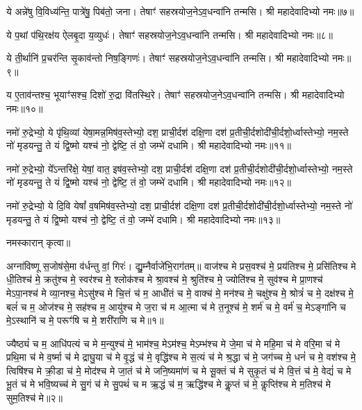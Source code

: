 ये अन्ने॑षु वि॒विध्य॑न्ति॒ पात्रे॑षु॒ पिब॑तो॒ जना\sn। तेषाꣳ॑ सहस्रयोज॒ने\-ऽव॒धन्वा॑नि तन्मसि। श्री महादेवादिभ्यो नमः॥७॥

ये प॒थां प॑थि॒रक्ष॑य ऐलबृ॒दा य॒व्युधः॑। तेषाꣳ॑ सहस्रयोज॒ने\-ऽव॒धन्वा॑नि तन्मसि। श्री महादेवादिभ्यो नमः॥८॥

ये ती॒र्थानि॑ प्र॒चर॑न्ति सृ॒काव॑न्तो निष॒ङ्गिणः॑। तेषाꣳ॑ सहस्रयोज॒ने\-ऽव॒धन्वा॑नि तन्मसि। श्री महादेवादिभ्यो नमः॥९॥

य ए॒ताव॑न्तश्च॒ भूयाꣳ॑सश्च॒ दिशो॑ रु॒द्रा वि॑तस्थि॒रे। तेषाꣳ॑ सहस्रयोज॒ने\-ऽव॒धन्वा॑नि तन्मसि। श्री महादेवादिभ्यो नमः॥१०॥

नमो॑ रु॒द्रेभ्यो॒ ये पृ॑थि॒व्यां येषा॒मन्न॒मिष॑व॒स्तेभ्यो॒ दश॒ प्राची॒र्दश॑ दक्षि॒णा दश॑ प्र॒तीची॒र्दशो\-दी॑ची॒र्दशो॒र्ध्वास्तेभ्यो॒ नम॒स्ते नो॑ मृडयन्तु॒ ते यं द्वि॒ष्मो यश्च॑ नो॒ द्वेष्टि॒ तं वो॒ जम्भे॑ दधामि। श्री महादेवादिभ्यो नमः॥११॥ 

नमो॑ रु॒द्रेभ्यो॒ ये᳚ऽन्तरि॑क्षे॒ येषां॒ वात॒ इष॑व॒स्तेभ्यो॒ दश॒ प्राची॒र्दश॑ दक्षि॒णा दश॑ प्र॒तीची॒र्दशो\-दी॑ची॒र्दशो॒र्ध्वास्तेभ्यो॒ नम॒स्ते नो॑ मृडयन्तु॒ ते यं द्वि॒ष्मो यश्च॑ नो॒ द्वेष्टि॒ तं वो॒ जम्भे॑ दधामि। श्री महादेवादिभ्यो नमः॥१२॥ 

नमो॑ रु॒द्रेभ्यो॒ ये दि॒वि येषां᳚ व॒\ar षमिष॑व॒स्तेभ्यो॒ दश॒ प्राची॒र्दश॑ दक्षि॒णा दश॑ प्र॒तीची॒र्दशो\-दी॑ची॒र्दशो॒र्ध्वास्तेभ्यो॒ नम॒स्ते नो॑ मृडयन्तु॒ ते यं द्वि॒ष्मो यश्च॑ नो॒ द्वेष्टि॒ तं वो॒ जम्भे॑ दधामि। श्री महादेवादिभ्यो नमः॥१३॥ 

नमस्कारान् कृत्वा॥

{\small \closesection}


अग्ना॑विष्णू स॒जोष॑से॒मा व॑र्धन्तु वां॒ गिरः॑। द्यु॒म्नैर्वाजे॑भि॒रा\-ग॑तम्॥ 
वाज॑श्च मे प्रस॒वश्च॑ मे॒ प्रय॑तिश्च मे॒ प्रसि॑तिश्च मे धी॒तिश्च॑ मे॒ क्रतु॑श्च मे॒ स्वर॑श्च मे॒ श्लोक॑श्च मे श्रा॒वश्च॑ मे॒ श्रुति॑श्च मे॒ ज्योति॑श्च मे॒ सुव॑श्च मे प्रा॒णश्च॑ मेऽपा॒नश्च॑ मे व्या॒नश्च॒ मेऽसु॑श्च मे चि॒त्तं च॑ म॒ आधी॑तं च मे॒ वाक्च॑ मे॒ मन॑श्च मे॒ चक्षु॑श्च मे॒ श्रोत्रं॑ च मे॒ दक्ष॑श्च मे॒ बलं॑ च म॒ ओज॑श्च मे॒ सह॑श्च म॒ आयु॑श्च मे ज॒रा च॑ म आ॒त्मा च॑ मे त॒नूश्च॑ मे॒ शर्म॑ च मे॒ वर्म॑ च॒ मेऽङ्गा॑नि च मे॒ऽस्थानि॑ च मे॒ परूꣳ॑षि च मे॒ शरी॑राणि च मे॥१॥ 

ज्यैष्ठ्यं॑ च म॒ आधि॑पत्यं च मे म॒न्युश्च॑ मे॒ भाम॑श्च॒ मेऽम॑श्च॒ मेऽम्भ॑श्च मे जे॒मा च॑ मे महि॒मा च॑ मे वरि॒मा च॑ मे प्रथि॒मा च॑ मे व॒र्ष्मा च॑ मे द्राघु॒या च॑ मे वृ॒द्धं च॑ मे॒ वृद्धि॑श्च मे स॒त्यं च॑ मे श्र॒द्धा च॑ मे॒ जग॑च्च मे॒ धनं॑ च मे॒ वश॑श्च मे॒ त्विषि॑श्च मे क्री॒डा च॑ मे॒ मोद॑श्च मे जा॒तं च॑ मे जनि॒ष्यमा॑णं च मे सू॒क्तं च॑ मे सुकृ॒तं च॑ मे वि॒त्तं च॑ मे॒ वेद्यं॑ च मे भू॒तं च॑ मे भवि॒ष्यच्च॑ मे सु॒गं च॑ मे सु॒पथं॑ च म ऋ॒द्धं च॑ म॒ ऋद्धि॑श्च मे कॢ॒प्तं च॑ मे॒ कॢप्ति॑श्च मे म॒तिश्च॑ मे सुम॒तिश्च॑ मे॥२॥ 

